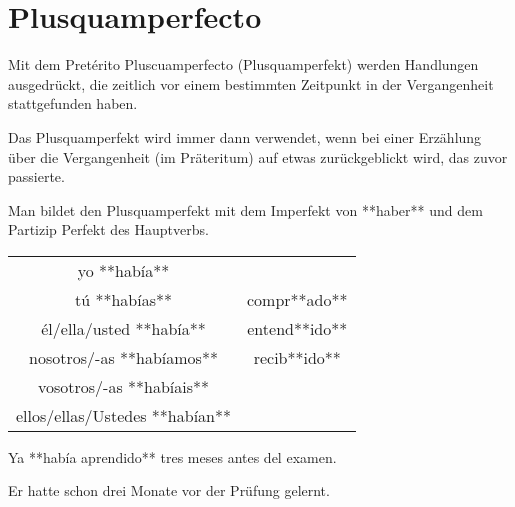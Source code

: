 \section*{Plusquamperfecto}

\begin{highlight}
Mit dem Pretérito Pluscuamperfecto (Plusquamperfekt) werden  Handlungen ausgedrückt, die zeitlich vor einem
bestimmten Zeitpunkt in der Vergangenheit stattgefunden haben.
\end{highlight}

Das Plusquamperfekt wird immer dann verwendet, wenn bei einer Erzählung über die Vergangenheit
(im Präteritum) auf etwas zurückgeblickt wird, das zuvor passierte.

Man bildet den Plusquamperfekt mit dem Imperfekt von **haber** und dem Partizip Perfekt des Hauptverbs.

\begin{tabular}{cc}
\hline
yo **había**                   & ~             \\
tú **habías**                  & compr**ado**  \\
él/ella/usted **había**        & entend**ido** \\
nosotros/-as **habíamos**      & recib**ido**  \\
vosotros/-as **habíais**        & ~             \\
ellos/ellas/Ustedes **habían** & ~             \\
\hline
\end{tabular}



\begin{compactitem}
    \item Ya **había aprendido** tres meses antes del examen.
    \begin{compactitem}\itshape
      \item Er hatte schon drei Monate vor der Prüfung gelernt.
    \end{compactitem}
\end{compactitem}
